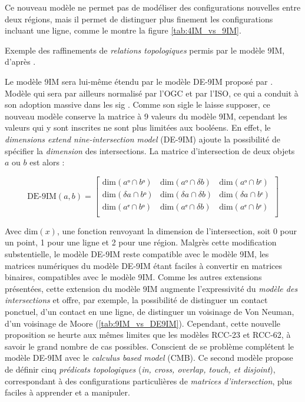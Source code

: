 Ce nouveau modèle ne permet pas de modéliser des configurations
nouvelles entre deux régions, mais il permet de distinguer plus
finement les configurations incluant une ligne, comme le montre la
figure \ref{tab:4IM_vs_9IM}.

\begin{table}
  \centering
  
  \caption{Exemple des raffinements de \emph{relations topologiques}
    permis par le modèle 9IM, d'après \textcite{Egenhofer2011}.}
  \label{tab:4IM_vs_9IM}
\end{table}

Le modèle 9IM sera lui-même étendu par le modèle DE-9IM proposé par
\textcite{Clementini1993}. Modèle qui sera par ailleurs normalisé par
l'OGC et par l'ISO, ce qui a conduit à son adoption massive dans les
\ac{sig} \autocite{Strobl2008}. Comme son sigle le laisse supposer, ce
nouveau modèle conserve la matrice à 9 valeurs du modèle 9IM,
cependant les valeurs qui y sont inscrites ne sont plus limitées aux
booléens. En effet, le \emph{dimensions extend nine-intersection
  model} (DE-9IM) ajoute la possibilité de spécifier la
\emph{dimension} des intersections. La matrice d'intersection de deux
objets \(a\) ou \(b\) est alors :

\begin{equation}
  \label{eq:matrice_DE9IM}
  \text{DE-9IM}(a,b) =
  \begin{bmatrix}
    \text{dim}(aᵒ ∩ bᵒ)&\text{dim}(aᵒ ∩ δb)&\text{dim}(aᵒ ∩ bᵉ)\\
    \text{dim}(δa ∩ bᵒ)&\text{dim}(δa ∩ δb)&\text{dim}(δa ∩ bᵉ)\\
    \text{dim}(aᵉ ∩ bᵒ)&\text{dim}(aᵉ ∩ δb)&\text{dim}(aᵉ ∩ bᵉ)\\
  \end{bmatrix}
\end{equation}

Avec \(\text{dim}(x)\), une fonction renvoyant la dimension de
l'intersection, soit 0 pour un point, 1 pour une ligne et 2 pour une
région. Malgrès cette modification substentielle, le modèle DE-9IM
reste compatible avec le modèle 9IM, les matrices numériques du modèle
DE-9IM étant faciles à convertir en matrices binaires, compatibles
avec le modèle 9IM. Comme les autres extensions présentées, cette
extension du modèle 9IM augmente l'expressivité du \emph{modèle des
  intersections} et offre, par exemple, la possibilité de distinguer
un contact ponctuel, d'un contact en une ligne, \ie de distinguer un
voisinage de Von Neuman, d'un voisinage de Moore
(\autoref{tab:9IM_vs_DE9IM}). Cependant, cette nouvelle proposition se
heurte aux mêmes limites que les modèles RCC-23 et RCC-62, à savoir le
grand nombre de cas possibles. Conscient de se problème
\textcite{Clementini1993} complétent le modèle DE-9IM avec le
\emph{calculus based model} (CMB). Ce second modèle propose de définir
cinq \emph{prédicats topologiques} (\emph{in, cross, overlap, touch,
  et disjoint}), correspondant à des configurations particulières de
\emph{matrices d'intersection}, plus faciles à apprender et a
manipuler.

